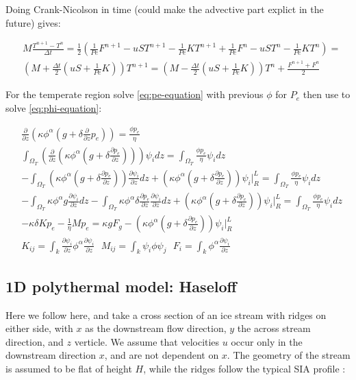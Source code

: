 \documentclass[a4paper,12pt]{article}
\newcommand{\pd}[2]{\frac{\partial #1}{\partial #2}}
\begin{document}
Doing Crank-Nicolson in time (could make the advective part explict in the future) gives:

\begin{align*}
  & M\frac{T^{n+1} - T^n}{\Delta t}   = \frac{1}{2}\left(\frac{1}{Pe}F^{n+1} - uST^{n+1} - \frac{1}{Pe}KT^{n+1} +\frac{1}{Pe}F^n - uST^n - \frac{1}{Pe}KT^n\right) = \\
  & \left(M + \frac{\Delta t}{2}\left(uS + \frac{1}{Pe}K\right)\right)T^{n+1} = \left(M - \frac{\Delta t}{2}\left(uS + \frac{1}{Pe}K\right)\right)T^{n} + \frac{F^{n+1} + F^n}{2}
\end{align*}

For the temperate region solve \eqref{eq:pe-equation} with previous $\phi$ for $P_e$ then use to solve \eqref{eq:phi-equation}:

\begin{align*}
  &\pd{}{z}\left(\kappa\phi^\alpha\left(g + \delta\pd{}{z}p_e\right)\right) = \frac{\phi p_e}{\eta}\\
  &\int_{\Omega_T}\left(\pd{}{z}\left(\kappa\phi^\alpha\left(g + \delta\pd{p_e}{z}\right)\right)\right) \psi_i dz = \int_{\Omega_T}\frac{\phi p_e}{\eta}\psi_idz\\
  &-\int_{\Omega_T}\left(\kappa\phi^\alpha\left(g + \delta\pd{p_e}{z}\right)\right) \pd{\psi_i}{z} dz + \left(\kappa\phi^\alpha\left(g + \delta\pd{p_e}{z}\right)\right)\psi_i \bigg\rvert_R^L= \int_{\Omega_T}\frac{\phi p_e}{\eta}\psi_idz\\
  &-\int_{\Omega_T} \kappa\phi^\alpha g \pd{\psi_i}{z}dz -\int_{\Omega_T} \kappa\phi^\alpha\delta\pd{p_e}{z}\pd{\psi_i}{z}  dz + \left(\kappa\phi^\alpha\left(g + \delta\pd{p_e}{z}\right)\right)\psi_i \bigg\rvert_R^L= \int_{\Omega_T}\frac{\phi p_e}{\eta}\psi_idz\\
  &-\kappa \delta K p_e - \frac{1}{\eta}M p_e = \kappa g F_g - \left(\kappa\phi^\alpha\left(g + \delta\pd{p_e}{z}\right)\right)\psi_i \bigg\rvert_R^L\\
  & K_{ij} = \int_k\pd{\psi_i}{z}\phi^{\alpha}\pd{\psi_i}{z} ~~~ M_{ij} = \int_k \psi_i \phi \psi_j ~~~ F_i = \int_k \phi^{\alpha}\pd{\psi_i}{z}
\end{align*}


\subsection{1D polythermal model: Haseloff}

Here we follow \cite{haseloff_2019} here, and take a cross section of an ice stream with ridges on either side, with $x$ as the downstream flow direction, $y$ the across stream direction, and $z$ verticle. We assume that velocities $u$ occur only in the downstream direction $x$, and are not dependent on $x$. The geometry of the stream is assumed to be flat of height $H$, while the ridges follow the typical SIA profile \cite{Greve_2009}:
\end{document}

